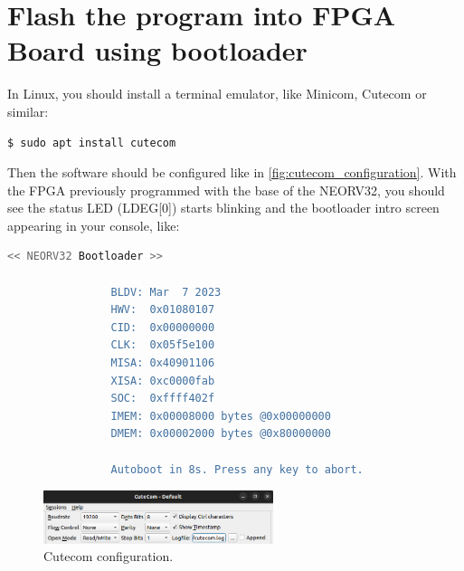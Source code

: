         
        
    \section{Flash the program into FPGA Board using bootloader} \label{sec:section_comp.1}
    
        In Linux, you should install a terminal emulator, like Minicom, Cutecom or similar:
        
            \begin{lstlisting}[style=mystyle_bash, language=bash]
                $ sudo apt install cutecom
            \end{lstlisting}
        
        Then the software should be configured like in \autoref{fig:cutecom_configuration}.  With the FPGA previously programmed with the base of the NEORV32, you should see the status LED (LDEG[0]) starts blinking and the bootloader intro screen appearing in your console, like:
        
            \begin{lstlisting}[style=mystyle_bash, language=bash]
                << NEORV32 Bootloader >>
            
                BLDV: Mar  7 2023
                HWV:  0x01080107
                CID:  0x00000000
                CLK:  0x05f5e100
                MISA: 0x40901106
                XISA: 0xc0000fab
                SOC:  0xffff402f
                IMEM: 0x00008000 bytes @0x00000000
                DMEM: 0x00002000 bytes @0x80000000
            
                Autoboot in 8s. Press any key to abort.
            \end{lstlisting}
            
            \begin{figure}[!ht]
                \begin{center}
                    \includegraphics[width= 0.6\textwidth]{figures/cutecom_configuration.png}
                    \caption{Cutecom configuration.}
                    \label{fig:cutecom_configuration}
                \end{center}
            \end{figure}
            
